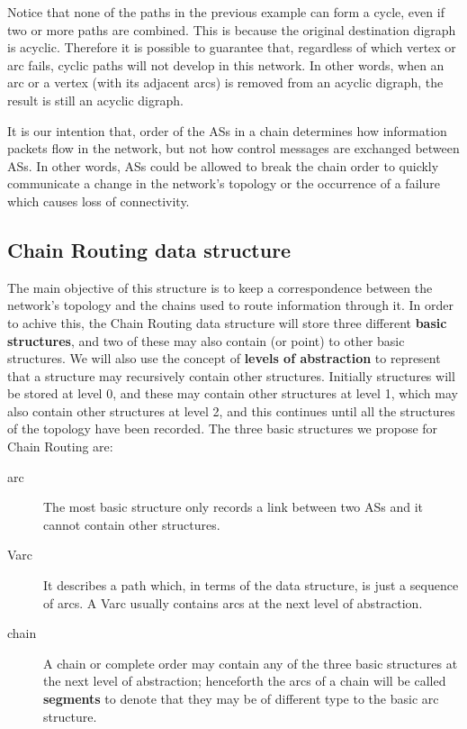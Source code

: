 \documentclass[5p,twocolumn]{elsarticle}
\begin{document}
Notice that none of the paths in the previous example can form a cycle, even if two or more paths are combined. This is because the original destination digraph is acyclic. Therefore it is possible to guarantee that, regardless of which vertex or arc fails, cyclic paths will not develop in this network. In other words, when an arc or a vertex (with its adjacent arcs) is removed from an acyclic digraph, the result is still an acyclic digraph.

It is our intention that, order of the ASs in a chain determines how information packets flow in the network, but not how control messages are exchanged between ASs. In other words, ASs could be allowed to break the chain order to quickly communicate a change in the network's topology or the occurrence of a failure which causes loss of connectivity.


\subsection{Chain Routing data structure}\label{crds}

The main objective of this structure is to keep a correspondence between the network's topology and the chains used to route information through it. In order to achive this, the Chain Routing data structure will store three different \textbf{basic structures}, and two of these may also contain (or point) to other basic structures. We will also use the concept of \textbf{levels of abstraction} to represent that a structure may recursively contain other structures. Initially structures will be stored at level 0, and these may contain other structures at level 1, which may also contain other structures at level 2, and this continues until all the structures of the topology have been recorded. The three basic structures we propose for Chain Routing are:

\begin{description}
	\item[arc] The most basic structure only records a link between two ASs and it cannot contain other structures.
	\item[Varc] It describes a path which, in terms of the data structure, is just a sequence of arcs. A Varc usually contains arcs at the next level of abstraction.
\item[chain] A chain or complete order may contain any of the three basic structures at the next level of abstraction; henceforth the arcs of a chain will be called \textbf{segments} to denote that they may be of different type to the basic arc structure.
\end{description}
\end{document}
